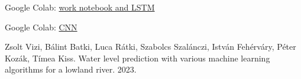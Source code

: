 \documentclass{article}
\begin{document}
Google Colab:
\href{https://colab.research.google.com/drive/1ZobMWBW76xJHmeTsbXmjmgCzcv5sGrSV?usp=sharing}{work
notebook and LSTM}

Google Colab:
\href{https://colab.research.google.com/drive/1TM0TM2p8cphnl7WuYu9bTIFMF2lW8gyv?usp=sharing}{CNN}

\begin{thebibliography}{1}
  \label{docs-internal-guid-e18268f8-7fff-47a5-5726-e8ca81959750}Zsolt
  Vizi, B{\'a}lint Batki, Luca R{\'a}tki, Szabolcs Szal{\'a}nczi, Istv{\'a}n
  Feh{\'e}rv{\'a}ry, P{\'e}ter Koz{\'a}k, T{\'i}mea Kiss. {\newblock}Water
  level prediction with various machine learning algorithms for a lowland
  river. {\newblock}2023.{\newblock}
\end{thebibliography}
\end{document}
